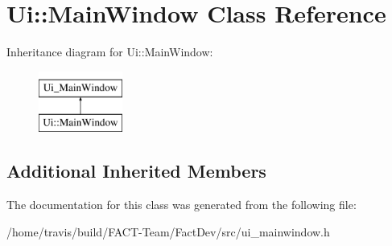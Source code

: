 \hypertarget{classUi_1_1MainWindow}{\section{Ui\-:\-:Main\-Window Class Reference}
\label{classUi_1_1MainWindow}
}
Inheritance diagram for Ui\-:\-:Main\-Window\-:\begin{figure}[H]
\begin{center}
\leavevmode
\includegraphics[height=2.000000cm]{d9/dbd/classUi_1_1MainWindow}
\end{center}
\end{figure}
\subsection*{Additional Inherited Members}


The documentation for this class was generated from the following file\-:\begin{DoxyCompactItemize}
\item 
/home/travis/build/\-F\-A\-C\-T-\/\-Team/\-Fact\-Dev/src/ui\-\_\-mainwindow.\-h\end{DoxyCompactItemize}

